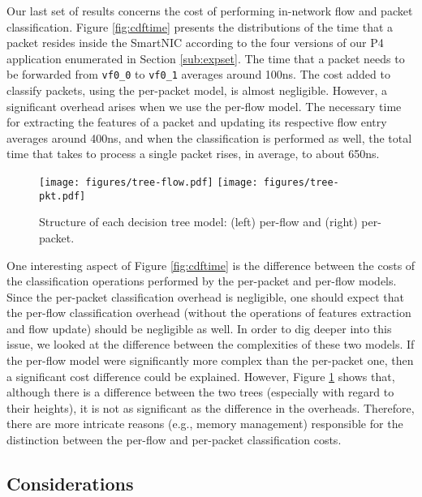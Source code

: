 Our last set of results concerns the cost of performing in-network flow and packet classification. Figure \ref{fig:cdftime} presents the distributions of the time that a packet resides inside the SmartNIC according to the four versions of our P4 application enumerated in Section \ref{sub:expset}. The time that a packet needs to be forwarded from \texttt{vf0\_0} to \texttt{vf0\_1} averages around 100ns. The cost added to classify packets, using the per-packet model, is almost negligible. However, a significant overhead arises when we use the per-flow model. The necessary time for extracting the features of a packet and updating its respective flow entry averages around 400ns, and when the classification is performed as well, the total time that takes to process a single packet rises, in average, to about 650ns. 

\begin{figure}
    \vspace{0.3cm}
    \centering
    \texttt{[image: figures/tree-flow.pdf]}
    \texttt{[image: figures/tree-pkt.pdf]}
    \caption{Structure of each decision tree model: (left) per-flow and  (right) per-packet.}
    \label{fig:tree}
\end{figure}

One interesting aspect of Figure \ref{fig:cdftime} is the difference between the costs of the classification operations performed by the per-packet and per-flow models. Since the per-packet classification overhead is negligible, one should expect that the per-flow classification overhead (without the operations of features extraction and flow update) should be negligible as well. In order to dig deeper into this issue, we looked at the difference between the complexities of these two models. If the per-flow model were significantly more complex than the per-packet one, then a significant cost difference could be explained. However, Figure \ref{fig:tree} shows that, although there is a difference between the two trees (especially with regard to their heights), it is not as significant as the difference in the overheads.
Therefore, there are more intricate reasons (e.g., memory management) responsible for the distinction between the per-flow and per-packet classification costs.

\subsection{Considerations}\label{sub:disc}

